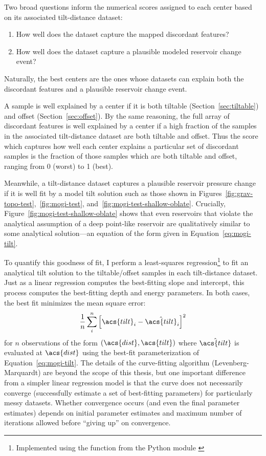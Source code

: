 Two broad questions inform the numerical scores assigned to each center based on its associated tilt-distance dataset:
\begin{enumerate}
    \item How well does the dataset capture the mapped discordant features?
    \item How well does the dataset capture a plausible modeled reservoir change event?
\end{enumerate}
Naturally, the best centers are the ones whose datasets can explain both the discordant features and a plausible reservoir change event.

A sample is well explained by a center if it is both tiltable (Section~\ref{sec:tiltable}) and offset (Section~\ref{sec:offset}). By the same reasoning, the full array of discordant features is well explained by a center if a high fraction of the samples in the associated tilt-distance dataset are both tiltable and offset. Thus the score which captures how well each center explains a particular set of discordant samples is the fraction of those samples which are both tiltable and offset, ranging from 0 (worst) to 1 (best).

Meanwhile, a tilt-distance dataset captures a plausible reservoir pressure change if it is well fit by a model tilt solution such as those shown in Figures~\ref{fig:grav-topo-test},~\ref{fig:mogi-test}, and~\ref{fig:mogi-test-shallow-oblate}. Crucially, Figure~\ref{fig:mogi-test-shallow-oblate} shows that even reservoirs that violate the analytical assumption of a deep point-like reservoir are qualitatively similar to some analytical solution---an equation of the form given in Equation~\eqref{eq:mogi-tilt}.

To quantify this goodness of fit, I perform a least-squares regression\footnote{Implemented using the  function from the  Python module \parencite{2020SciPy-NMeth}} to fit an analytical tilt solution to the tiltable/offset samples in each tilt-distance dataset. Just as a linear regression computes the best-fitting slope and intercept, this process computes the best-fitting depth and energy parameters. In both cases, the best fit minimizes the mean square error:
\begin{equation}
    \frac{1}{n}\sum_{i}^{n}{\left[\acs{tilt}_i-\hat{\acs{tilt}}_i\right]}^2\label{eq:mse}
\end{equation}
for $n$ observations of the form $(\acs{dist}, \acs{tilt})$ where $\hat{\acs{tilt}}$ is evaluated at $\acs{dist}$ using the best-fit parameterization of Equation~\eqref{eq:mogi-tilt}. The details of the curve-fitting algorithm (Levenberg-Marquardt) are beyond the scope of this thesis, but one important difference from a simpler linear regression model is that the curve does not necessarily converge (successfully estimate a set of best-fitting parameters) for particularly messy datasets. Whether convergence occurs (and even the final parameter estimates) depends on initial parameter estimates and maximum number of iterations allowed before ``giving up'' on convergence.

